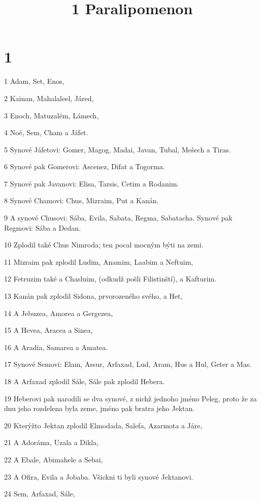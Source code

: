 

\title{1 Paralipomenon}

\chapter{1}

\par 1 Adam, Set, Enos,
\par 2 Kainan, Mahalaleel, Járed,
\par 3 Enoch, Matuzalém, Lámech,
\par 4 Noé, Sem, Cham a Jáfet.
\par 5 Synové Jáfetovi: Gomer, Magog, Madai, Javan, Tubal, Mešech a Tiras.
\par 6 Synové pak Gomerovi: Ascenez, Difat a Togorma.
\par 7 Synové pak Javanovi: Elisa, Tarsis, Cetim a Rodanim.
\par 8 Synové Chamovi: Chus, Mizraim, Put a Kanán.
\par 9 A synové Chusovi: Sába, Evila, Sabata, Regma, Sabatacha. Synové pak Regmovi: Sába a Dedan.
\par 10 Zplodil také Chus Nimroda; ten pocal mocným býti na zemi.
\par 11 Mizraim pak zplodil Ludim, Anamim, Laabim a Neftuim,
\par 12 Fetruzim také a Chasluim, (odkudž pošli Filistinští), a Kafturim.
\par 13 Kanán pak zplodil Sidona, prvorozeného svého, a Het,
\par 14 A Jebuzea, Amorea a Gergezea,
\par 15 A Hevea, Aracea a Sinea,
\par 16 A Aradia, Samarea a Amatea.
\par 17 Synové Semovi: Elam, Assur, Arfaxad, Lud, Aram, Hus a Hul, Geter a Mas.
\par 18 A Arfaxad zplodil Sále, Sále pak zplodil Hebera.
\par 19 Heberovi pak narodili se dva synové, z nichž jednoho jméno Peleg, proto že za dnu jeho rozdelena byla zeme, jméno pak bratra jeho Jektan.
\par 20 Kterýžto Jektan zplodil Elmodada, Salefa, Azarmota a Járe,
\par 21 A Adoráma, Uzala a Dikla,
\par 22 A Ebale, Abimahele a Sebai,
\par 23 A Ofira, Evila a Jobaba. Všickni ti byli synové Jektanovi.
\par 24 Sem, Arfaxad, Sále,
